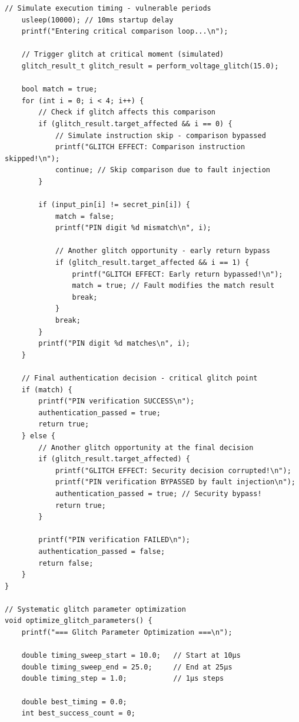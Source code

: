 \documentclass[12pt,a4paper]{article}
\begin{document}
\begin{lstlisting}[caption={Complete Voltage Glitching Attack System}]
    // Simulate execution timing - vulnerable periods
    usleep(10000); // 10ms startup delay
    printf("Entering critical comparison loop...\n");
    
    // Trigger glitch at critical moment (simulated)
    glitch_result_t glitch_result = perform_voltage_glitch(15.0);
    
    bool match = true;
    for (int i = 0; i < 4; i++) {
        // Check if glitch affects this comparison
        if (glitch_result.target_affected && i == 0) {
            // Simulate instruction skip - comparison bypassed
            printf("GLITCH EFFECT: Comparison instruction skipped!\n");
            continue; // Skip comparison due to fault injection
        }
        
        if (input_pin[i] != secret_pin[i]) {
            match = false;
            printf("PIN digit %d mismatch\n", i);
            
            // Another glitch opportunity - early return bypass
            if (glitch_result.target_affected && i == 1) {
                printf("GLITCH EFFECT: Early return bypassed!\n");
                match = true; // Fault modifies the match result
                break;
            }
            break;
        }
        printf("PIN digit %d matches\n", i);
    }
    
    // Final authentication decision - critical glitch point
    if (match) {
        printf("PIN verification SUCCESS\n");
        authentication_passed = true;
        return true;
    } else {
        // Another glitch opportunity at the final decision
        if (glitch_result.target_affected) {
            printf("GLITCH EFFECT: Security decision corrupted!\n");
            printf("PIN verification BYPASSED by fault injection\n");
            authentication_passed = true; // Security bypass!
            return true;
        }
        
        printf("PIN verification FAILED\n");
        authentication_passed = false;
        return false;
    }
}

// Systematic glitch parameter optimization
void optimize_glitch_parameters() {
    printf("=== Glitch Parameter Optimization ===\n");
    
    double timing_sweep_start = 10.0;   // Start at 10μs
    double timing_sweep_end = 25.0;     // End at 25μs
    double timing_step = 1.0;           // 1μs steps
    
    double best_timing = 0.0;
    int best_success_count = 0;
    

\end{lstlisting}
\end{document}
